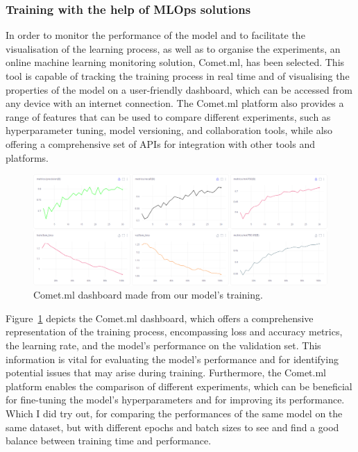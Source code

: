 \subsubsection{Training with the help of MLOps solutions}\label{subsec:training-with-the-help-of-mlops-solutions}
In order to monitor the performance of the model and to facilitate the visualisation of the learning process,
as well as to organise the experiments, an online machine learning monitoring solution, Comet.ml, has been selected.
This tool is capable of tracking the training process in real time and of visualising the properties of the model on
a user-friendly dashboard, which can be accessed from any device with an internet connection.
The Comet.ml platform also provides a range of features that can be used to compare different experiments,
such as hyperparameter tuning, model versioning, and collaboration tools, while also offering a comprehensive
set of APIs for integration with other tools and platforms.

\begin{figure}[ht]
\centering
\includegraphics[width=1.0\textwidth]{figures/model}
\caption{Comet.ml dashboard made from our model's training.}
\label{fig:comet}
\end{figure}

Figure~\ref{fig:comet} depicts the Comet.ml dashboard, which offers a comprehensive representation of the training process,
encompassing loss and accuracy metrics, the learning rate, and the model's performance on the validation set.
This information is vital for evaluating the model's performance and for identifying potential issues that may arise during training.
Furthermore, the Comet.ml platform enables the comparison of different experiments,
which can be beneficial for fine-tuning the model's hyperparameters and for improving its performance.
Which I did try out, for comparing the performances of the same model on the same dataset,
but with different epochs and batch sizes to see and find a good balance between training time and performance.

